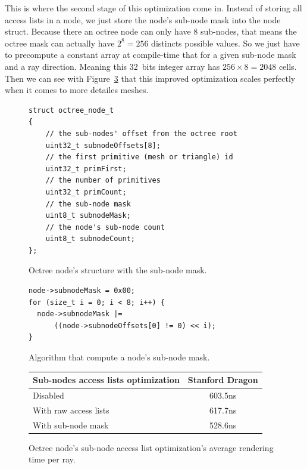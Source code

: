This is where the second stage of this optimization come in. Instead of storing
all access lists in a node, we just store the node's sub-node mask into the
node struct. Because there an octree node can only have 8 sub-nodes, that
means the octree mask can actually have $2^8 = 256$ distincts possible values.
So we just have to precompute a constant array at compile-time that for a given sub-node mask
and a ray direction. Meaning this 32~bits integer array has $256 \times 8 = 2048$
cells. Then we can see with Figure~\ref{table:subnode_access_list} that this
improved optimization scales perfectly when it comes to more detailes meshes.

\begin{figure}[H]
    \centering
    \begin{lstlisting}[morekeywords={uint8_t,uint32_t}]
struct octree_node_t
{
    // the sub-nodes' offset from the octree root
    uint32_t subnodeOffsets[8];
    // the first primitive (mesh or triangle) id
    uint32_t primFirst;
    // the number of primitives
    uint32_t primCount;
    // the sub-node mask
    uint8_t subnodeMask;
    // the node's sub-node count
    uint8_t subnodeCount;
};
    \end{lstlisting}
    \caption{Octree node's structure with the sub-node mask.}
    \label{code:mask_access_list}
\end{figure}

\begin{figure}[H]
    \centering
    \begin{lstlisting}[morekeywords={uint8_t,uint32_t}]
node->subnodeMask = 0x00;
for (size_t i = 0; i < 8; i++) {
  node->subnodeMask |=
      ((node->subnodeOffsets[0] != 0) << i);
}
    \end{lstlisting}
    \caption{Algorithm that compute a node's sub-node mask.}
    \label{code:mask_access_list}
\end{figure}

\begin{figure}[H]
    \tiny
    \centering
    \begin{tabular}{ | l | c | }
        \hline
        Sub-nodes access lists optimization & Stanford Dragon \\
        \hline
        Disabled & 603.5ns \\
        With raw access lists & 617.7ns \\
        With sub-node mask & 528.6ns \\
        \hline
    \end{tabular}
    \caption{
        Octree node's sub-node access list optimization's average rendering
        time per ray.
    }
    \label{table:subnode_access_list}
\end{figure}
